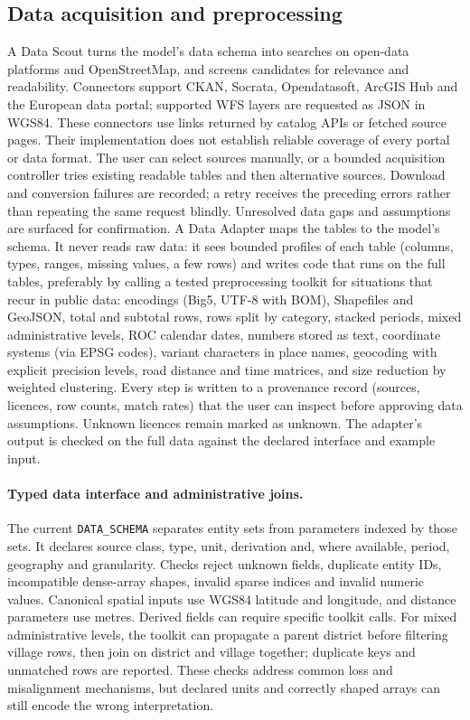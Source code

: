 \subsection{Data acquisition and preprocessing}
A Data Scout turns the model's data schema into searches on open-data platforms and OpenStreetMap, and screens
candidates for relevance and readability. Connectors support CKAN, Socrata, Opendatasoft, ArcGIS Hub and the
European data portal; supported WFS layers are requested as JSON in WGS84. These connectors use links returned
by catalog APIs or fetched source pages. Their implementation does not establish reliable coverage of every
portal or data format. The user can select sources manually, or a bounded acquisition
controller tries existing readable tables and then alternative sources. Download and conversion failures are
recorded; a retry receives the preceding errors rather than repeating the same request blindly. Unresolved
data gaps and assumptions are surfaced for confirmation. A Data Adapter maps the tables to
the model's schema. It never reads raw data: it sees bounded profiles of each table (columns, types, ranges,
missing values, a few rows) and writes code that runs on the full tables, preferably by calling a tested
preprocessing toolkit for situations that recur in public data: encodings (Big5, UTF-8 with BOM), Shapefiles and
GeoJSON, total and subtotal rows, rows split by category, stacked periods, mixed administrative levels, ROC
calendar dates, numbers stored as text, coordinate systems (via EPSG codes), variant characters in place names,
geocoding with explicit precision levels, road distance and time matrices, and size reduction by weighted
clustering. Every step is written to a provenance record (sources, licences, row counts, match rates) that the
user can inspect before approving data assumptions. Unknown licences remain marked as unknown. The adapter's
output is checked on the full data against the declared interface and example input.

\paragraph{Typed data interface and administrative joins.}
The current \texttt{DATA\_SCHEMA} separates entity sets from parameters indexed by those sets. It declares
source class, type, unit, derivation and, where available, period, geography and granularity. Checks reject
unknown fields, duplicate entity IDs, incompatible dense-array shapes, invalid sparse indices and invalid
numeric values. Canonical spatial inputs use WGS84 latitude and longitude, and distance parameters use metres.
Derived fields can require specific toolkit calls. For mixed administrative levels, the toolkit can propagate a
parent district before filtering village rows, then join on district and village together; duplicate keys and
unmatched rows are reported. These checks address common loss and misalignment mechanisms, but declared units
and correctly shaped arrays can still encode the wrong interpretation.

